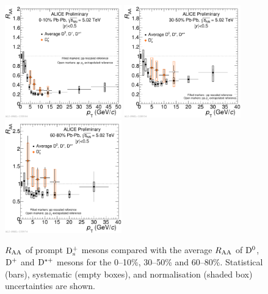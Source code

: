 \begin{figure}[!h]
\centering
\includegraphics[angle=0, width=0.45\textwidth]{FigCap5/DmesonAverageDs_010.pdf}
\includegraphics[angle=0, width=0.45\textwidth]{FigCap5/DmesonAverageDs_3050.pdf}
\includegraphics[angle=0, width=0.45\textwidth]{FigCap5/DmesonAverageDs_6080.pdf}
 \caption{$R_{\rm AA}$ 
  of prompt ${\rm D_s^+}$ mesons 
  compared with the average $R_{\rm AA}$ of ${\rm D^0}$, ${\rm D^+}$ and ${\rm D^{*+}}$ mesons for the 
0--10\%, 30--50\% and 60--80\%. 
Statistical (bars),  systematic (empty boxes), and normalisation (shaded box) 
uncertainties are shown.}
 \label{fig:DmesRaa} 
\end{figure} 



